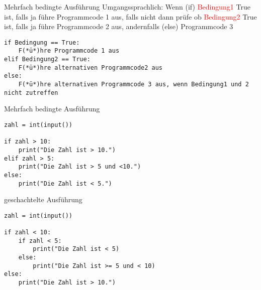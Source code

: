 \begin{frame}[fragile]{Mehrfach bedingte Ausführung}
Umgangssprachlich: Wenn (if)  \textcolor{red}{Bedingung1} True ist, falls ja führe Programmcode 1 aus, falls nicht dann prüfe ob \textcolor{red}{Bedingung2} True ist, falls ja führe Programmcode 2 aus, andernfalls (else) Programmcode 3\\

\begin{lstlisting}
if Bedingung == True:
	F(*ü*)hre Programmcode 1 aus
elif Bedingung2 == True:
	F(*ü*)hre alternativen Programmcode2 aus
else:
	F(*ü*)hre alternativen Programmcode 3 aus, wenn Bedingung1 und 2 nicht zutreffen
\end{lstlisting}
\end{frame}

\begin{frame}[fragile]{Mehrfach bedingte Ausführung}
\begin{lstlisting}
zahl = int(input())

if zahl > 10:
	print("Die Zahl ist > 10.")
elif zahl > 5:
	print("Die Zahl ist > 5 und <10.")
else:
	print("Die Zahl ist < 5.")
\end{lstlisting}
\end{frame}

\begin{frame}[fragile]{geschachtelte Ausführung}

\begin{lstlisting}
zahl = int(input())

if zahl < 10:
	if zahl < 5:
		print("Die Zahl ist < 5)
	else:
		print("Die Zahl ist >= 5 und < 10)
else:
	print("Die Zahl ist > 10.")
\end{lstlisting}
\end{frame}


